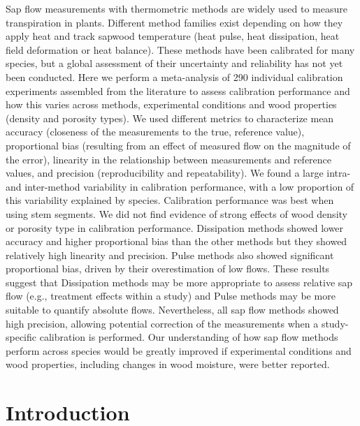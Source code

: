 \documentclass[11pt,twoside]{reedthesis}
\begin{document}
Sap flow measurements with thermometric methods are widely used to
measure transpiration in plants. Different method families exist
depending on how they apply heat and track sapwood temperature (heat
pulse, heat dissipation, heat field deformation or heat balance). These
methods have been calibrated for many species, but a global assessment
of their uncertainty and reliability has not yet been conducted. Here we
perform a meta-analysis of 290 individual calibration experiments
assembled from the literature to assess calibration performance and how
this varies across methods, experimental conditions and wood properties
(density and porosity types). We used different metrics to characterize
mean accuracy (closeness of the measurements to the true, reference
value), proportional bias (resulting from an effect of measured flow on
the magnitude of the error), linearity in the relationship between
measurements and reference values, and precision (reproducibility and
repeatability). We found a large intra- and inter-method variability in
calibration performance, with a low proportion of this variability
explained by species. Calibration performance was best when using stem
segments. We did not find evidence of strong effects of wood density or
porosity type in calibration performance. Dissipation methods showed
lower accuracy and higher proportional bias than the other methods but
they showed relatively high linearity and precision. Pulse methods also
showed significant proportional bias, driven by their overestimation of
low flows. These results suggest that Dissipation methods may be more
appropriate to assess relative sap flow (e.g., treatment effects within
a study) and Pulse methods may be more suitable to quantify absolute
flows. Nevertheless, all sap flow methods showed high precision,
allowing potential correction of the measurements when a study-specific
calibration is performed. Our understanding of how sap flow methods
perform across species would be greatly improved if experimental
conditions and wood properties, including changes in wood moisture, were
better reported.\par

\newpage

\section{Introduction}\label{introduction}
\end{document}
